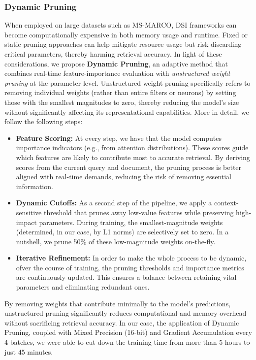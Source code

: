 \subsubsection{Dynamic Pruning}

When employed on large datasets such as MS-MARCO, DSI frameworks can become computationally expensive in both memory usage and runtime. Fixed or static pruning approaches can help mitigate resource usage but risk discarding critical parameters, thereby harming retrieval accuracy. In light of these considerations, we propose \textbf{Dynamic Pruning}, an adaptive method that combines real-time feature-importance evaluation with \textit{unstructured weight pruning} at the parameter level. Unstructured weight pruning specifically refers to removing individual weights (rather than entire filters or neurons) by setting those with the smallest magnitudes to zero, thereby reducing the model’s size without significantly affecting its representational capabilities. More in detail, we follow the following steps:
\begin{itemize}
    \item \textbf{Feature Scoring:} At every step, we have that the model computes importance indicators (e.g., from attention distributions). These scores guide which features are likely to contribute most to accurate retrieval. By deriving scores from the current query and document, the pruning process is better aligned with real-time demands, reducing the risk of removing essential information.
    \item \textbf{Dynamic Cutoffs:} As a second step of the pipeline, we apply a context-sensitive threshold that prunes away low-value features while preserving high-impact parameters. During training, the smallest-magnitude weights (determined, in our case, by L1 norms) are selectively set to zero. In a nutshell, we prune 50\% of these low-magnitude weights on-the-fly.
    \item \textbf{Iterative Refinement:} In order to make the whole process to be dynamic, ofver the course of training, the pruning thresholds and importance metrics are continuously updated. This ensures a balance between retaining vital parameters and eliminating redundant ones. 
\end{itemize}

By removing weights that contribute minimally to the model’s predictions, unstructured pruning significantly reduces computational and memory overhead without sacrificing retrieval accuracy. In our case, the application of Dynamic Pruning, coupled with Mixed Precision (16-bit) and Gradient Accumulation every 4 batches, we were able to cut-down the training time from more than 5 hours to just 45 minutes.  
